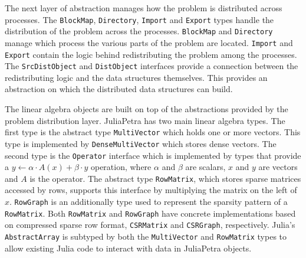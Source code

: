 \documentclass[acmsmall]{acmart}
\newcommand{\snippet}[1]{\lstinline{#1}}
\begin{document}
	The next layer of abstraction manages how the problem is distributed across processes.
	The \snippet{BlockMap}, \snippet{Directory}, \snippet{Import} and \snippet{Export}
	types handle the distribution of the problem across the processes.
	\snippet{BlockMap} and \snippet{Directory} manage which process the various parts of
	the problem are located.
	\snippet{Import} and \snippet{Export} contain the logic behind redistributing
	the problem among the processes.
	The \snippet{SrcDistObject} and \snippet{DistObject} interfaces provide a connection between
	the redistributing logic and the data structures themselves.
	This provides an abstraction on which the distributed data structures can build.
	
	The linear algebra objects are built on top of the abstractions provided by the problem distribution layer.
	JuliaPetra has two main linear algebra types.
	The first type is the abstract type \snippet{MultiVector} which holds one or more vectors.
	This type is implemented by \snippet{DenseMultiVector} which stores dense vectors.
	The second type is the \snippet{Operator} interface which is implemented by types that provide a
	\(y \gets \alpha\cdot A(x) + \beta\cdot y\) operation, where \(\alpha\) and \(\beta\) are scalars,
	\(x\) and \(y\) are vectors and \(A\) is the operator.
	The abstract type \snippet{RowMatrix}, which stores sparse matrices accessed by rows,
	supports this interface by multiplying the matrix on the left of \(x\).
	\snippet{RowGraph} is an additionally type used to represent the sparsity pattern of a \snippet{RowMatrix}.
	Both \snippet{RowMatrix} and \snippet{RowGraph} have concrete implementations based on
	compressed sparse row format, \snippet{CSRMatrix} and \snippet{CSRGraph}, respectively.
	Julia's \snippet{AbstractArray} is subtyped by both the \snippet{MultiVector}
	and \snippet{RowMatrix} types to allow existing Julia code to interact with data in JuliaPetra objects.
	
\end{document}
